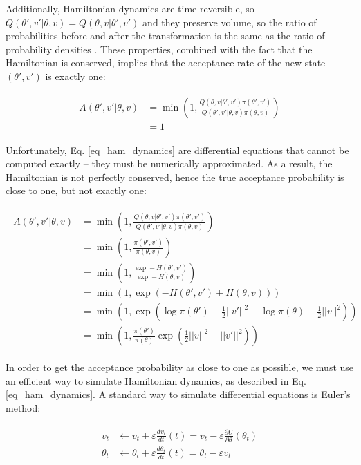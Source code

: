 \documentclass[12pt]{article}
\begin{document}
{Additionally, Hamiltonian dynamics are time-reversible, so $Q(\theta',v'|\theta,v) = Q(\theta,v|\theta',v')$ and they preserve volume, so the ratio of probabilities before and after the transformation is the same as the ratio of probability densities . These properties, combined with the fact that the Hamiltonian is conserved, implies that the acceptance rate of the new state $(\theta', v')$ is exactly one:

\begin{align}
\begin{split}
A(\theta',v'|\theta,v) &= \min \left(1, \frac{Q(\theta,v|\theta',v')\pi(\theta',v')}{Q(\theta',v'|\theta,v)\pi(\theta,v)} \right) \\
&= 1
\end{split}
\end{align}

Unfortunately, Eq. \ref{eq_ham_dynamics} are differential equations that cannot be computed exactly -- they must be numerically approximated. As a result, the Hamiltonian is not perfectly conserved, hence the true acceptance probability is close to one, but not exactly one:

\begin{align}
\begin{split}
A(\theta',v'|\theta,v) &= \min \left(1, \frac{Q(\theta,v|\theta',v')\pi(\theta',v')}{Q(\theta',v'|\theta,v)\pi(\theta,v)} \right) \\
&= \min \left(1, \frac{\pi(\theta',v')}{\pi(\theta,v)} \right) \\
&= \min \left(1, \frac{\exp -H(\theta',v')}{\exp -H(\theta,v)} \right) \\
&= \min \left(1, \exp \left(-H(\theta', v') + H(\theta, v) \right) \right) \\
&= \min \left(1, \exp \left(\log \pi(\theta') - \frac{1}{2}||v'||^2 -\log \pi(\theta) + \frac{1}{2}||v||^2 \right) \right) \\
&= \min \left(1, \frac{\pi(\theta')}{\pi(\theta)} \exp \left( \frac{1}{2}||v||^2 - ||v'||^2 \right) \right)
\end{split}
\label{eq_hmc_accept_prob}
\end{align}

In order to get the acceptance probability as close to one as possible, we must use an efficient way to simulate Hamiltonian dynamics, as described in Eq. \ref{eq_ham_dynamics}. A standard way to simulate differential equations is Euler’s method:

\begin{align}
\begin{split}
v_t &\leftarrow v_t + \varepsilon \frac{dv_t}{dt}(t) = v_t - \varepsilon \frac{\partial U}{\partial \theta}(\theta_t) \\
\theta_t &\leftarrow \theta_t + \varepsilon \frac{d\theta_t}{dt}(t) = \theta_t - \varepsilon v_t
\end{split}
\end{align}

}
\end{document}
